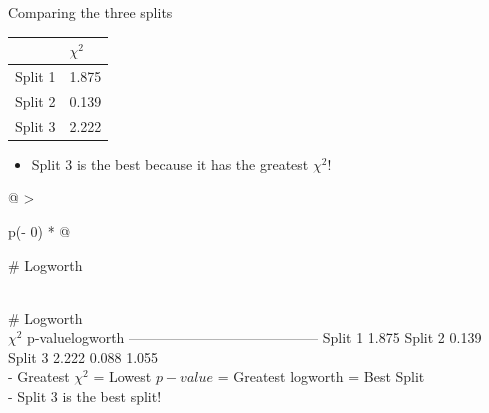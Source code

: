 \documentclass[
  ignorenonframetext,
]{beamer}
\providecommand{\tightlist}{%
  \setlength{\itemsep}{0pt}\setlength{\parskip}{0pt}}
\begin{document}
\begin{frame}{Comparing the three splits}
\protect\hypertarget{comparing-the-three-splits}{}
\begin{longtable}[]{@{}ll@{}}
\toprule
& \(\chi^2\) \\
\midrule
\endhead
Split 1 & 1.875 \\
Split 2 & 0.139 \\
Split 3 & 2.222 \\
\bottomrule
\end{longtable}

\begin{itemize}
\tightlist
\item
  Split 3 is the best because it has the greatest \(\chi^2\)!
\end{itemize}

\begin{longtable}[]{@{}
  >{\raggedright\arraybackslash}p{(\columnwidth - 0\tabcolsep) * }@{}}
\toprule
\begin{minipage}[b]{\linewidth}\raggedright
\# Logworth
\end{minipage} \\
\midrule
\endhead
\# Logworth \\
\textbar{} \textbar{} \(\chi^2\)
\textbar p-value\textbar logworth\textbar{}
\textbar---------\textbar-----------\textbar-----------\textbar-----------\textbar{}
\textbar{} Split 1 \textbar{} 1.875 \textbar{}
\textbar{} Split 2 \textbar{} 0.139 
\textbar{} Split 3 \textbar{} 2.222 \textbar{} 0.088 \textbar{}
1.055\textbar{} \\
- Greatest \(\chi^2\) = Lowest \(p-value\) = Greatest logworth = Best
Split \\
- Split 3 is the best split! \\
\bottomrule
\end{longtable}
\end{frame}
\end{document}

